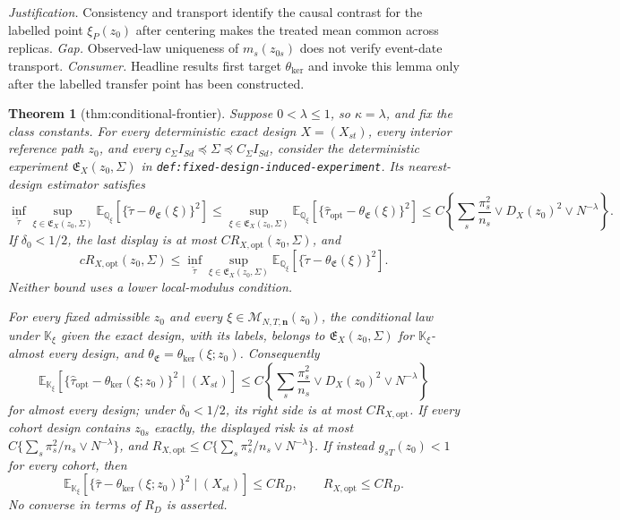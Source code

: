 \documentclass{article}
\newtheorem{theorem}{Theorem}
\begin{document}
\par\smallskip\noindent \textit{Justification.} Consistency and transport identify the causal contrast for the labelled point \(\xi_P(z_0)\) after centering makes the treated mean common across replicas. \textit{Gap.} Observed-law uniqueness of \(m_s(z_{0s})\) does not verify event-date transport. \textit{Consumer.} Headline results first target \(\theta_{\mathrm{ker}}\) and invoke this lemma only after the labelled transfer point has been constructed.

\begin{theorem}[thm:conditional-frontier]\label{thm:conditional-frontier}
Suppose \(0<\lambda\le1\), so \(\kappa=\lambda\), and fix the class
constants.  For every deterministic exact design \(X=(X_{st})\), every
interior reference path \(z_0\), and every
\(c_\Sigma I_{Sd}\preceq\Sigma\preceq C_\Sigma I_{Sd}\), consider the
deterministic experiment \(\mathfrak E_X(z_0,\Sigma)\) in
\texttt{def:fixed-design-induced-experiment}.  Its nearest-design estimator
satisfies
\[
 \inf_{\widetilde\tau}\sup_{\xi\in\mathfrak E_X(z_0,\Sigma)}
 \mathbb E_{\mathbb Q_\xi}
 \left[\{\widetilde\tau-\theta_{\mathfrak E}(\xi)\}^2\right]
 \le
 \sup_{\xi\in\mathfrak E_X(z_0,\Sigma)}
 \mathbb E_{\mathbb Q_\xi}
 \left[\{\widehat\tau_{\mathrm{opt}}-\theta_{\mathfrak E}(\xi)\}^2\right]
 \le C\left\{\sum_s\frac{\pi_s^2}{n_s}
          \vee D_X(z_0)^2\vee N^{-\lambda}\right\}.
\]
If \(\delta_0<1/2\), the last display is at most
\(CR_{X,\mathrm{opt}}(z_0,\Sigma)\), and
\[
 cR_{X,\mathrm{opt}}(z_0,\Sigma)
 \le
 \inf_{\widetilde\tau}\sup_{\xi\in\mathfrak E_X(z_0,\Sigma)}
 \mathbb E_{\mathbb Q_\xi}
 \left[\{\widetilde\tau-\theta_{\mathfrak E}(\xi)\}^2\right].
\]
Neither bound uses a lower local-modulus condition.

For every fixed admissible \(z_0\) and every
\(\xi\in\mathcal M_{N,T,\mathbf n}(z_0)\), the conditional law under
\(\mathbb K_\xi\) given the exact design, with its labels, belongs to
\(\mathfrak E_X(z_0,\Sigma)\) for \(\mathbb K_\xi\)-almost every design,
and \(\theta_{\mathfrak E}=\theta_{\mathrm{ker}}(\xi;z_0)\).  Consequently
\[
 \mathbb E_{\mathbb K_\xi}
 \left[\{\widehat\tau_{\mathrm{opt}}
 -\theta_{\mathrm{ker}}(\xi;z_0)\}^2\mid(X_{st})\right]
 \le C\left\{\sum_s\frac{\pi_s^2}{n_s}
          \vee D_X(z_0)^2\vee N^{-\lambda}\right\}
\]
for almost every design; under \(\delta_0<1/2\), its right side is at most
\(CR_{X,\mathrm{opt}}\).  If every cohort design contains \(z_{0s}\)
exactly, the displayed risk is at most
\(C\{\sum_s\pi_s^2/n_s\vee N^{-\lambda}\}\), and
\(R_{X,\mathrm{opt}}\le C\{\sum_s\pi_s^2/n_s\vee N^{-\lambda}\}\).
If instead \(g_{sT}(z_0)<1\) for every cohort, then
\[
 \mathbb E_{\mathbb K_\xi}
 \left[\{\widehat\tau-\theta_{\mathrm{ker}}(\xi;z_0)\}^2
 \mid(X_{st})\right]\le CR_D,
 \qquad R_{X,\mathrm{opt}}\le CR_D.
\]
No converse in terms of \(R_D\) is asserted.


\end{theorem}
\end{document}
